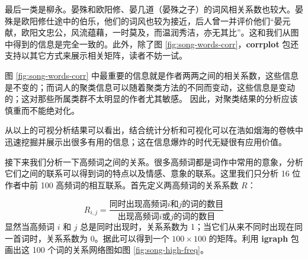\documentclass[
  b5paper,
  UTF8,twoside]{book}
\begin{document}
最后一类是柳永。晏殊和欧阳修、晏几道（晏殊之子）的词风相关系数也较大。晏殊是欧阳修仕途中的伯乐，他们的词风也较为接近，后人曾一并评价他们``晏元献，欧阳文忠公，风流蕴藉，一时莫及，而温润秀洁，亦无其比''。这和我们从图中得到的信息是完全一致的。此外，除了图 \ref{fig:song-words-corr}，\textbf{corrplot} 包还支持以其它方式来展示相关矩阵，读者不妨一试。

图 \ref{fig:song-words-corr} 中最重要的信息就是作者两两之间的相关系数，这些信息是不变的；而词人的聚类信息可以随着聚类方法的不同而变动，这些信息是变动的；这对那些所属类群不太明显的作者尤其敏感。 因此，对聚类结果的分析应该慎重而不能绝对化。

从以上的可视分析结果可以看出，结合统计分析和可视化可以在浩如烟海的卷帙中迅速挖掘并展示出很多有用的信息；这在信息爆炸的时代无疑很有应用价值。

接下来我们分析一下高频词之间的关系。很多高频词都是词作中常用的意象，分析它们之间的联系可以得到词的特点以及情感、意象的联系。这里我们只分析 16 位作者中前 100 高频词的相互联系。首先定义两高频词的关系系数 \(R\)：

\[R_{i,j}=\frac{\mbox{同时出现高频词}i\mbox{和}{j}\mbox{的词的数目}}{\mbox{出现高频词}i\mbox{或}j\mbox{的词的数目}}\]
显然当高频词 \(i\) 和 \(j\) 总是同时出现时，关系系数为 1；当它们从来不同时出现在同一首词时，关系系数为 0。据此可以得到一个 \(100\times100\) 的矩阵。利用 \textbf{igraph} 包 \citep{igraph} 画出这 100 个词的关系网络图如图 \ref{fig:song-high-freq}。
\end{document}
